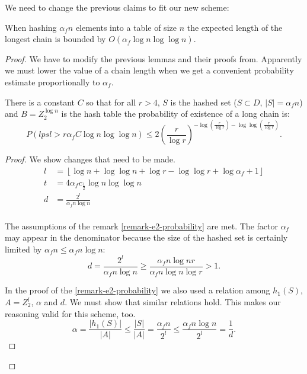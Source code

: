 We need to change the previous claims to fit our new scheme: 
\begin{theorem}
\label{theorem-n-to-n}
When hashing $\alpha_f n$ elements into a table of size $n$ the expected length of the longest chain is bounded by $O(\alpha_f \log n \log \log n)$.
\end{theorem}
\begin{proof}
We have to modify the previous lemmas and their proofs from. Apparently we must lower the value of a chain length when we get a convenient probability estimate proportionally to $\alpha_f$. 

\begin{remark}
There is a constant $C$ so that for all $r > 4$, $S$ is the hashed set ($S \subset D$, $|S| = \alpha_f n$) and $B = Z_2^{\log n}$ is the hash table the probability of existence of a long chain is:
\begin{displaymath}
P(lpsl > r \alpha_f C \log n \log \log n) \leq 2 \left(\frac{r}{\log r}\right)^{-\log \left(\frac{r}{\log r}\right) - \log \log \left(\frac{r}{\log r}\right)}\textit{.}
\end{displaymath}
\end{remark}
\begin{proof}
We show changes that need to be made. 
\begin{displaymath}
\begin{split}
l & = \left\lfloor \log n + \log \log n + \log r - \log \log r + \log \alpha_f + 1 \right\rfloor \\
t & = 4\alpha_f c_{\frac{1}{2}} \log n \log \log n \\
d & = \frac{2^l}{\alpha_f n \log n} \\
\end{split}
\end{displaymath}

The assumptions of the remark \ref{remark-e2-probability} are met. The factor $\alpha_f$ may appear in the denominator because the size of the hashed set is certainly limited by $\alpha_f n \leq \alpha_f n \log n$:
\begin{displaymath}
d = \frac{2^l}{\alpha_f n \log n} \geq \frac{\alpha_f n \log n r}{\alpha_f n \log n \log r} > 1 \textit{.}
\end{displaymath}

In the proof of the \ref{remark-e2-probability} we also used a relation among $h_1(S)$, $A = Z_2^l$, $\alpha$ and $d$. We must show that similar relations hold. This makes our reasoning valid for this scheme, too.
\begin{displaymath}
\alpha = \frac{|h_1(S)|}{|A|}\leq \frac{|S|}{|A|} = \frac{\alpha_f n}{2^l} \leq \frac{\alpha_f n \log n}{2^l} = \frac{1}{d} \textit{.}
\end{displaymath}


\end{proof}
\end{proof}
